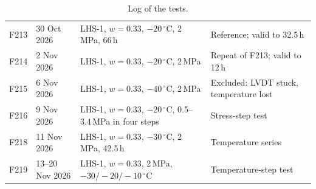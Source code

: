 \begin{table}[H]
\begin{tabularx}{\textwidth}{@{}l l >{\raggedright\arraybackslash}X >{\raggedright\arraybackslash}X@{}}
F213 & 30 Oct 2026 & LHS-1, $w = 0.33$, $-20\,^\circ$C, 2\,MPa, 66\,h & Reference; valid to 32.5\,h \\
F214 & 2 Nov 2026 & LHS-1, $w = 0.33$, $-20\,^\circ$C, 2\,MPa & Repeat of F213; valid to 12\,h \\
F215 & 6 Nov 2026 & LHS-1, $w = 0.33$, $-40\,^\circ$C, 2\,MPa & Excluded: LVDT stuck, temperature lost \\
F216 & 9 Nov 2026 & LHS-1, $w = 0.33$, $-20\,^\circ$C, 0.5--3.4\,MPa in four steps & Stress-step test \\
F218 & 11 Nov 2026 & LHS-1, $w = 0.33$, $-30\,^\circ$C, 2\,MPa, 42.5\,h & Temperature series \\
F219 & 13--20 Nov 2026 & LHS-1, $w = 0.33$, 2\,MPa, $-30/-20/-10\,^\circ$C & Temperature-step test \\
\bottomrule
\end{tabularx}
\caption{Log of the tests.}
\label{tab:test_log}
\end{table}
